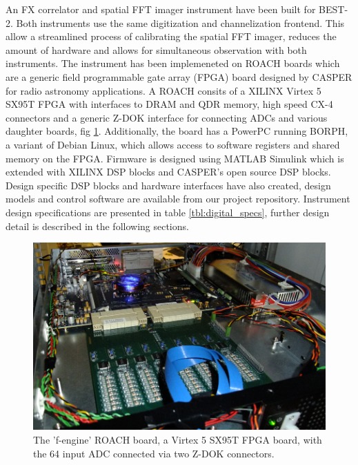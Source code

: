 \documentclass[useAMS,macros,usenatbib,onecolumn]{mn2e}
\begin{document}
An FX correlator and spatial FFT imager instrument have been built for BEST-2.
Both instruments use the same digitization and channelization frontend.
This allow a streamlined process of calibrating the spatial FFT imager, reduces the amount of hardware and allows for simultaneous observation with both instruments.
The instrument has been implemeneted on ROACH boards which are a generic field programmable gate array (FPGA) board designed by CASPER for radio astronomy applications.
A ROACH consits of a XILINX Virtex 5 SX95T FPGA with interfaces to DRAM and QDR memory, high speed CX-4 connectors and a generic Z-DOK interface for connecting ADCs and various daughter boards, fig \ref{fig:roach}.
Additionally, the board has a PowerPC running BORPH, a variant of Debian Linux, which allows access to software registers and shared memory on the FPGA.
Firmware is designed using MATLAB Simulink which is extended with XILINX DSP blocks and CASPER's open source DSP blocks\citep{}.
Design specific DSP blocks and hardware interfaces have also created, design models and control software are available from our project repository\citep{}.
Instrument design specifications are presented in table \ref{tbl:digital_specs}, further design detail is described in the following sections.

\begin{figure}
    \centering
    \includegraphics[scale=0.4]{graphics/roach_feng.png}
    \caption{The 'f-engine' ROACH board, a Virtex 5 SX95T FPGA board, with the 64 input ADC connected via two Z-DOK connectors.}
    \label{fig:roach}
\end{figure}
\end{document}
